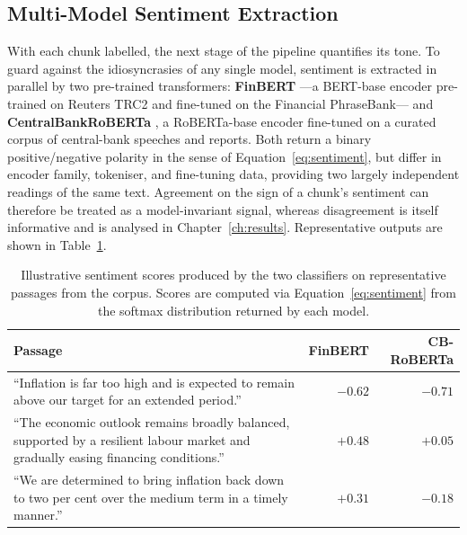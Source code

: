 \subsection{Multi-Model Sentiment Extraction}
\label{sec:sentiment_extraction}

With each chunk labelled, the next stage of the pipeline quantifies its tone. To guard against the idiosyncrasies of any single model, sentiment is extracted in parallel by two pre-trained transformers: \textbf{FinBERT} \cite{araci2019finbert}---a BERT-base encoder pre-trained on Reuters TRC2 and fine-tuned on the Financial PhraseBank--- and \textbf{CentralBankRoBERTa} \cite{Pfeifer2023}, a RoBERTa-base encoder fine-tuned on a curated corpus of central-bank speeches and reports. Both return a binary positive/negative polarity in the sense of Equation~\ref{eq:sentiment}, but differ in encoder family, tokeniser, and fine-tuning data, providing two largely independent readings of the same text. Agreement on the sign of a chunk's sentiment can therefore be treated as a model-invariant signal, whereas disagreement is itself informative and is analysed in Chapter~\ref{ch:results}. Representative outputs are shown in Table~\ref{tab:sentiment_examples}.

\begin{table}[ht]
    \centering
    \caption[Illustrative sentiment scores produced by the two classifiers]{Illustrative sentiment scores produced by the two classifiers on representative passages from the corpus. Scores are computed via Equation~\ref{eq:sentiment} from the softmax distribution returned by each model.}
    \label{tab:sentiment_examples}
    \begin{tabular}{@{}p{9.5cm}rr@{}}
        \toprule
        \textbf{Passage}                                                                                                                     & \textbf{FinBERT} & \textbf{CB-RoBERTa} \\ \midrule
        ``Inflation is far too high and is expected to remain above our target for an extended period.''                                     & $-0.62$          & $-0.71$             \\ \addlinespace
        ``The economic outlook remains broadly balanced, supported by a resilient labour market and gradually easing financing conditions.'' & $+0.48$          & $+0.05$             \\ \addlinespace
        ``We are determined to bring inflation back down to two per cent over the medium term in a timely manner.''                          & $+0.31$          & $-0.18$             \\ \bottomrule
    \end{tabular}
\end{table}

